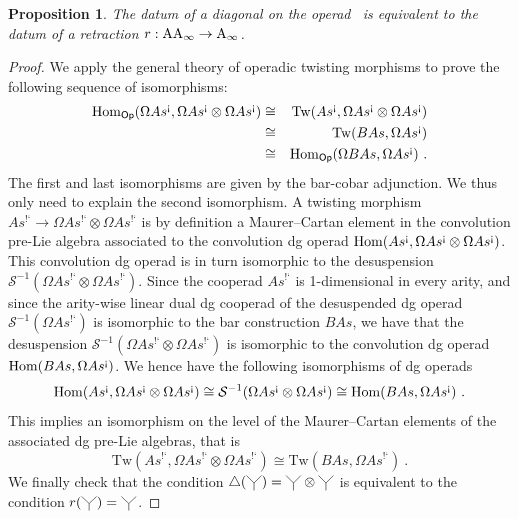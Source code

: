 \documentclass[10pt]{amsart}
\newtheorem{proposition}[definition]{Proposition}
\theoremstyle{remark}
\begin{document}
\begin{proposition}
\label{prop:retract}
The datum of a diagonal on the operad \Ainf\ is equivalent to the datum of a retraction $r : \mathrm{AA}_\infty \rightarrow \mathrm{A}_\infty$.
\end{proposition}

\begin{proof}
We apply the general theory of operadic twisting morphisms \cite[Section 6.4]{LodayVallette12} to prove the following sequence of isomorphisms: 
\begin{eqnarray*}
  \mathrm{Hom}_{\mathsf{Op}} (\Omega As^{\text{!`}}, \Omega As^{\text{!`}} \otimes \Omega As^{\text{!`}}) & \cong & \mathrm{Tw}(As^{\text{!`}}, \Omega As^{\text{!`}} \otimes \Omega As^{\text{!`}}) \\
  & \cong & \mathrm{Tw}(B As,\Omega As^{\text{!`}}) \\
  & \cong & \mathrm{Hom}_{\mathsf{Op}} (\Omega B As, \Omega As^{\text{!`}}) \ . 
\end{eqnarray*}
The first and last isomorphisms are given by the bar-cobar adjunction. We thus only need to explain the second isomorphism. 
A twisting morphism $As^{\text{!`}}\to \Omega As^{\text{!`}} \otimes \Omega As^{\text{!`}}$ is by definition a Maurer--Cartan element in the convolution pre-Lie algebra associated to the convolution dg operad $\mathrm{Hom} (As^{\text{!`}}, \Omega As^{\text{!`}} \otimes \Omega As^{\text{!`}})$.
This convolution dg operad is in turn isomorphic to the desuspension $\mathcal{S}^{-1}(\Omega As^{\text{!`}} \otimes \Omega As^{\text{!`}})$.
Since the cooperad $As^{\text{!`}}$ is 1-dimensional in every arity, and since the arity-wise linear dual dg cooperad of the desuspended dg operad $\mathcal{S}^{-1}(\Omega As^{\text{!`}})$ is isomorphic to the bar construction $B As$, we have that 
the desuspension $\mathcal{S}^{-1}(\Omega As^{\text{!`}} \otimes \Omega As^{\text{!`}})$ is isomorphic to the convolution dg operad $\mathrm{Hom} (B As, \Omega As^{\text{!`}})$. 
We hence have the following isomorphisms of dg operads
\[ \mathrm{Hom} (As^{\text{!`}}, \Omega As^{\text{!`}} \otimes \Omega As^{\text{!`}}) \cong \mathcal{S}^{-1}(\Omega As^{\text{!`}} \otimes \Omega As^{\text{!`}}) \cong \mathrm{Hom} (B As, \Omega As^{\text{!`}}) \ . \]
This implies an isomorphism on the level of the Maurer--Cartan elements of the associated dg pre-Lie algebras, that is
\[ \mathrm{Tw}(As^{\text{!`}}, \Omega As^{\text{!`}} \otimes \Omega As^{\text{!`}}) \cong \mathrm{Tw}(B As,\Omega As^{\text{!`}}) \ . \]
We finally check that the condition $\triangle (\premiertermecobarbarA) = \premiertermecobarbarA \otimes \premiertermecobarbarA$ is equivalent to the condition $r(\premiertermecobarbarA)=\premiertermecobarbarA$.
\end{proof}
\end{document}
